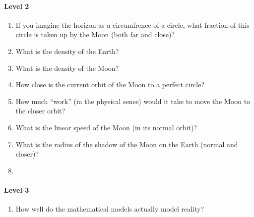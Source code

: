 \documentclass{ximera}
\begin{document}
\begin{problem}
\begin{freeResponse}
  \paragraph{Level 2}
  \begin{enumerate}
  \item If you imagine the horizon as a circumfrence of a circle, what
    fraction of this circle is taken up by the Moon (both far and
    close)?
  \item What is the density of the Earth?
  \item What is the density of the Moon?
  \item How close is the current orbit of the Moon to a perfect circle?
  \item How much ``work'' (in the physical sense) would it take to
    move the Moon to the closer orbit?
  \item What is the linear speed of the Moon (in its normal orbit)?
  \item What is the radius of the shadow of the Moon on the Earth
    (normal and closer)?
  \item 
  \end{enumerate}
  
  \paragraph{Level 3}
  \begin{enumerate}
  \item How well do the mathematical models actually model reality? 
  \end{enumerate}
\end{freeResponse}
\end{problem}

\end{document}
